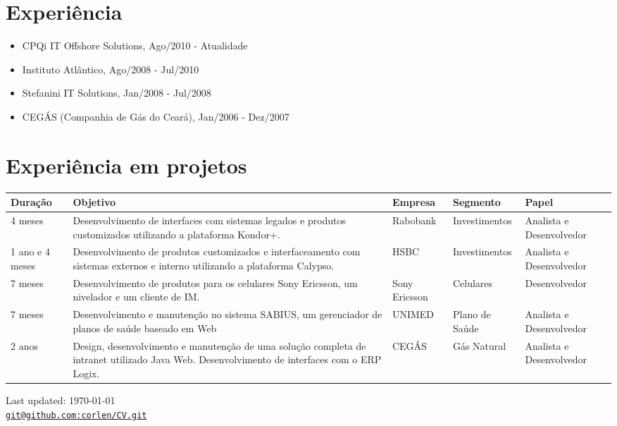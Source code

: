 \documentclass[letterpaper]{article}
\makeatletter
\def\footerlink{git@github.com:corlen/CV.git}
\makeatother
\begin{document}
\section*{Experiência}

\begin{itemize}
\item CPQi IT Offshore Solutions, Ago/2010 - Atualidade
\item Instituto Atlântico, Ago/2008 - Jul/2010
\item Stefanini IT Solutions, Jan/2008 - Jul/2008
\item CEGÁS (Companhia de Gás do Ceará), Jan/2006 - Dez/2007
\end{itemize}

\section*{Experiência em projetos}
\begin{tabular}{| p{1.2cm} | p{7cm} | p{2.2cm} | p{2.2cm} | l |}
  \hline
  \textbf{Duração} & \textbf{Objetivo} & \textbf{Empresa} & \textbf{Segmento} & \textbf{Papel} \\
  \hline  
  4 meses & Desenvolvimento de interfaces com sistemas legados e produtos customizados utilizando a plataforma Kondor+. & Rabobank & Investimentos & Analista e Desenvolvedor \\
  \hline
  1 ano e 4 meses & Desenvolvimento de produtos customizados e interfaceamento com sistemas externos e interno utilizando a plataforma Calypso. & HSBC & Investimentos & Analista e Desenvolvedor \\
  \hline
  7 meses & Desenvolvimento de produtos para os celulares Sony Ericsson, um nivelador e um cliente de IM. & Sony Ericsson & Celulares & Desenvolvedor \\
  \hline
  7 meses & Desenvolvimento e manutenção no sistema SABIUS, um gerenciador de planos de saúde baseado em Web & UNIMED & Plano de Saúde & Analista e Desenvolvedor \\
  \hline
  2 anos & Design, desenvolvimento e manutenção de uma solução completa de intranet utilizado Java Web. Desenvolvimento de interfaces com o ERP Logix. & CEGÁS & Gás Natural & Analista e Desenvolvedor \\
  \hline
\end{tabular}

\bigskip

\begin{center}
  \begin{footnotesize}
    Last updated: \today \\
    \href{\footerlink}{\texttt{\footerlink}}
  \end{footnotesize}
\end{center}
\end{document}

